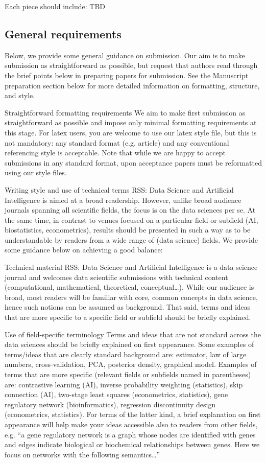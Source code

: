 Each piece should include:
TBD


\subsection{General requirements}
Below, we provide some general guidance on submission. Our aim is to make submission as straightforward as possible, but request that authors read through the brief points below in preparing papers for submission. See the Manuscript preparation section below for more detailed information on formatting, structure, and style.

Straightforward formatting requirements
We aim to make first submission as straightforward as possible and impose only minimal formatting requirements at this stage. For latex users, you are welcome to use our latex style file, but this is not mandatory: any standard format (e.g. article) and any conventional referencing style is acceptable. Note that while we are happy to accept submissions in any standard format, upon acceptance papers must be reformatted using our style files.

Writing style and use of technical terms
RSS: Data Science and Artificial Intelligence is aimed at a broad readership. However, unlike broad audience journals spanning all scientific fields, the focus is on the data sciences per se. At the same time, in contrast to venues focused on a particular field or subfield (AI, biostatistics, econometrics), results should be presented in such a way as to be understandable by readers from a wide range of (data science) fields. We provide some guidance below on achieving a good balance:

Technical material
RSS: Data Science and Artificial Intelligence is a data science journal and welcomes data scientific submissions with technical content (computational, mathematical, theoretical, conceptual…). While our audience is broad, most readers will be familiar with core, common concepts in data science, hence such notions can be assumed as background. That said, terms and ideas that are more specific to a specific field or subfield should be briefly explained.

Use of field-specific terminology
Terms and ideas that are not standard across the data sciences should be briefly explained on first appearance. Some examples of terms/ideas that are clearly standard background are: estimator, law of large numbers, cross-validation, PCA, posterior density, graphical model. Examples of terms that are more specific (relevant fields or subfields named in parentheses) are: contrastive learning (AI), inverse probability weighting (statistics), skip connection (AI), two-stage least squares (econometrics, statistics), gene regulatory network (bioinformatics), regression discontinuity design (econometrics, statistics). For terms of the latter kind, a brief explanation on first appearance will help make your ideas accessible also to readers from other fields, e.g. “a gene regulatory network is a graph whose nodes are identified with genes and edges indicate biological or biochemical relationships between genes. Here we focus on networks with the following semantics…”

